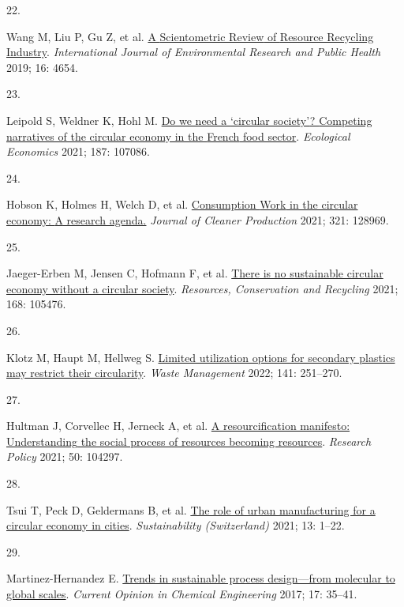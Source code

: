 \documentclass[
  11pt,
  a4paperpaper,
  onecolumn]{article}
\newlength{\cslhangindent}
\newlength{\csllabelwidth}
\newlength{\cslentryspacingunit} %
\newenvironment{CSLReferences}[2] %
 {%
  \setlength{\parindent}{0pt}
  \ifodd #1
  \let\oldpar\par
  \def\par{\hangindent=\cslhangindent\oldpar}
  \fi
  \setlength{\parskip}{#2\cslentryspacingunit}
 }%
 {}
\newcommand{\CSLLeftMargin}[1]{\parbox[t]{\csllabelwidth}{#1}}
\newcommand{\CSLRightInline}[1]{\parbox[t]{\linewidth - \csllabelwidth}{#1}\break}
\begin{document}
\begin{CSLReferences}{0}{0}
\leavevmode{}%
\CSLLeftMargin{22. }%
\CSLRightInline{Wang M, Liu P, Gu Z, et al.
\href{https://doi.org/10.3390/ijerph16234654}{A {Scientometric Review}
of {Resource Recycling Industry}}. \emph{International Journal of
Environmental Research and Public Health} 2019; 16: 4654.}

\leavevmode{}%
\CSLLeftMargin{23. }%
\CSLRightInline{Leipold S, Weldner K, Hohl M.
\href{https://doi.org/10.1016/j.ecolecon.2021.107086}{Do we need a
{`circular society'}? {Competing} narratives of the circular economy in
the {French} food sector}. \emph{Ecological Economics} 2021; 187:
107086.}

\leavevmode{}%
\CSLLeftMargin{24. }%
\CSLRightInline{Hobson K, Holmes H, Welch D, et al.
\href{https://doi.org/10.1016/J.JCLEPRO.2021.128969}{Consumption {Work}
in the circular economy: {A} research agenda.} \emph{Journal of Cleaner
Production} 2021; 321: 128969.}

\leavevmode{}%
\CSLLeftMargin{25. }%
\CSLRightInline{Jaeger-Erben M, Jensen C, Hofmann F, et al.
\href{https://doi.org/10.1016/j.resconrec.2021.105476}{There is no
sustainable circular economy without a circular society}.
\emph{Resources, Conservation and Recycling} 2021; 168: 105476.}

\leavevmode{}%
\CSLLeftMargin{26. }%
\CSLRightInline{Klotz M, Haupt M, Hellweg S.
\href{https://doi.org/10.1016/J.WASMAN.2022.01.002}{Limited utilization
options for secondary plastics may restrict their circularity}.
\emph{Waste Management} 2022; 141: 251--270.}

\leavevmode{}%
\CSLLeftMargin{27. }%
\CSLRightInline{Hultman J, Corvellec H, Jerneck A, et al.
\href{https://doi.org/10.1016/j.respol.2021.104297}{A resourcification
manifesto: {Understanding} the social process of resources becoming
resources}. \emph{Research Policy} 2021; 50: 104297.}

\leavevmode{}%
\CSLLeftMargin{28. }%
\CSLRightInline{Tsui T, Peck D, Geldermans B, et al.
\href{https://doi.org/10.3390/su13010023}{The role of urban
manufacturing for a circular economy in cities}. \emph{Sustainability
(Switzerland)} 2021; 13: 1--22.}

\leavevmode{}%
\CSLLeftMargin{29. }%
\CSLRightInline{Martinez-Hernandez E.
\href{https://doi.org/10.1016/j.coche.2017.05.005}{Trends in sustainable
process design---from molecular to global scales}. \emph{Current Opinion
in Chemical Engineering} 2017; 17: 35--41.}


\end{CSLReferences}
\end{document}
